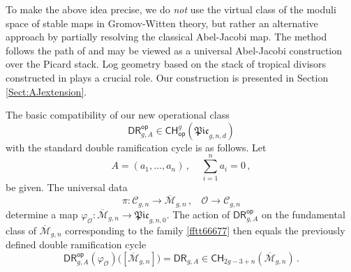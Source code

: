 \documentclass[a4paper,12pt]{article} %
\newcommand{\ca}[1]{{\mathcal{#1}}}
\def\cO{\mathcal{O}}
\def\cM{{\mathcal{M}}}
\theoremstyle{definition}
\theoremstyle{plain}%
\renewcommand{\phi}{\varphi}
\newcommand{\Picabs}{\mathfrak{Pic}}
\newcommand{\jocomment}[1]{}
\begin{document}



To make the above idea precise, we do {\em not} use the virtual class of the moduli space of stable
maps in Gromov-Witten theory, but rather an alternative approach by
partially resolving the classical Abel-Jacobi map.
The method follows the path 
of \cite{Holmes2017Extending-the-d, Holmes2017Multiplicativit}
and
may be viewed  as a universal Abel-Jacobi construction
over the Picard stack. 
Log geometry based on the stack of tropical divisors constructed in \cite{Marcus2017Logarithmic-com}
plays a crucial role.
Our construction is presented in Section \ref{Sect:AJextension}.

The basic compatibility of our new operational class $$\mathsf{DR}^{\mathsf{op}}_{g,A} \in {\mathsf{CH}}^g_{\mathsf{op}}(\Picabs_{g,n,d})$$ with the
standard double ramification cycle is as follows.
Let 
$$A = (a_1, \dots, a_n)\,,\ \ \ \ \  \sum_{i=1}^n a_i=0 \,,$$
be given. 
The universal data 
\begin{equation}\label{fftt66677}
\pi: \mathcal{C}_{g,n} \rightarrow \overline{\cM}_{g,n}\, , \ \ \ \ \cO \rightarrow \mathcal{C}_{g,n}
\end{equation}
determine a map $\phi_{\ca O} : \overline{\cM}_{g,n} \to \Picabs_{g,n,0}$.
The action of $\mathsf{DR}^{\mathsf{op}}_{g,A}$ on the fundamental class
of $\overline{\mathcal{M}}_{g,n}$ corresponding to the family \eqref{fftt66677} then equals the previously defined
double ramification cycle
$$\mathsf{DR}^{\mathsf{op}}_{g,A}(\phi_{\ca O})\Big( [\overline{\mathcal{M}}_{g,n}]\Big)= \mathsf{DR}_{g,A}
\in {\mathsf{CH}}_{2g-3+n}(\overline{\mathcal{M}}_{g,n})
\, .$$
\end{document}
